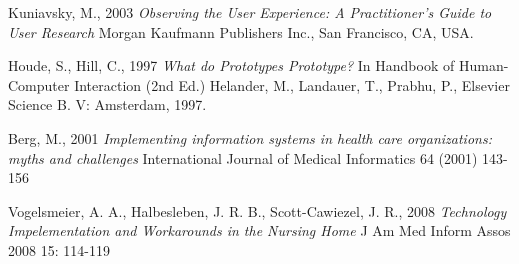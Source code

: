\documentclass[b5paper, 11pt, norsk]{MScthesisITEM}
\begin{document}
\begin{thebibliography}{99}
Kuniavsky, M., 2003 
\emph{Observing the User Experience: A Practitioner's Guide to User Research}
Morgan Kaufmann Publishers Inc., San Francisco, CA, USA.

Houde, S., Hill, C., 1997
\emph{What do Prototypes Prototype?}
In Handbook of Human-Computer Interaction (2nd Ed.)
Helander, M., Landauer, T., Prabhu, P.,
Elsevier Science B. V:
Amsterdam, 1997.

Berg, M., 2001
\emph{Implementing information systems in health care organizations: myths and challenges}
International Journal of Medical Informatics 64 (2001) 143-156

Vogelsmeier, A. A., Halbesleben, J. R. B., Scott-Cawiezel, J. R., 2008
\emph{Technology Impelementation and Workarounds in the Nursing Home}
J Am Med Inform Assos 2008 15: 114-119

\end{thebibliography}

\end{document}
